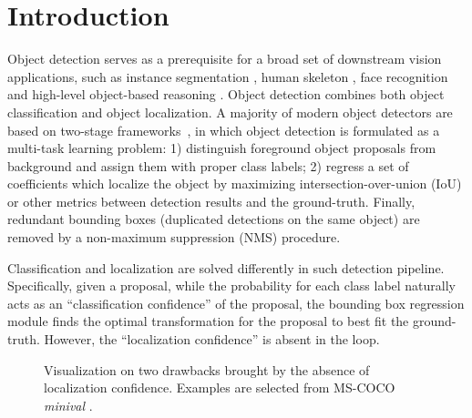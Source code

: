 \documentclass[runningheads]{llncs}
\begin{document}
\section{Introduction}
Object detection serves as a prerequisite for a broad set of downstream vision applications, such as instance segmentation \cite{pinheiro2015learning,pinheiro2016learning}, human skeleton \cite{toshev2014deeppose}, face recognition \cite{taigman2014deepface} and high-level object-based reasoning \cite{wu2017learning}.
Object detection combines both object classification and object localization.
A majority of modern object detectors are based on two-stage frameworks~\cite{Girshick_2014_CVPR,Girshick_2015_ICCV,ren2015faster,Lin_2017_CVPR,he2017mask}, in which object detection is formulated as a multi-task learning problem: 1) distinguish foreground object proposals from background and assign them with proper class labels; 2) regress a set of coefficients which localize the object by maximizing intersection-over-union (IoU) or other metrics between detection results and the ground-truth. Finally, redundant bounding boxes (duplicated detections on the same object) are removed by a non-maximum suppression (NMS) procedure.

Classification and localization are solved differently in such detection pipeline. Specifically, given a proposal, while the probability for each class label naturally acts as an ``classification confidence'' of the proposal, the bounding box regression module finds the optimal transformation for the proposal to best fit the ground-truth. However, the ``localization confidence'' is absent in the loop.

\begin{figure}[!t]
\centering
\caption{Visualization on two drawbacks brought by the absence of localization confidence. Examples are selected from MS-COCO \emph{minival} \cite{lin2014microsoft}.}\label{fig:example}
\end{figure}
\end{document}
